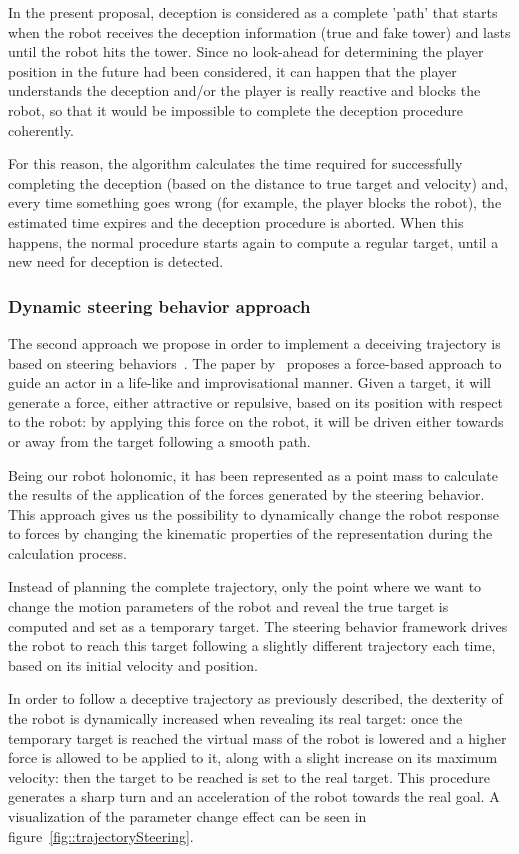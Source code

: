 In the present proposal, deception is considered as a complete 'path' that starts when the robot receives the deception information (true and fake tower) and lasts until the robot hits the tower. Since no look-ahead for determining the player position in the future had been considered, it can happen that the player understands the deception and/or the player is really reactive and blocks the robot, so that it would be impossible to complete the deception procedure coherently.

For this reason, the algorithm calculates the time required for successfully completing the deception (based on the distance to true target and velocity) and, every time something goes wrong (for example, the player blocks the robot), the estimated time expires and the deception procedure is aborted. When this happens, the normal procedure starts again to compute a regular target, until a new need for deception is detected.

\subsubsection{Dynamic steering behavior approach}
The second approach we propose in order to implement a deceiving trajectory is based on steering behaviors~\citep{reynolds_steering_1999}. The paper by~\cite{reynolds_steering_1999} proposes a force-based approach to guide an actor in a life-like and improvisational manner. Given a target, it will generate a force, either attractive or repulsive, based on its position with respect to the robot: by applying this force on the robot, it will be driven either towards or away from the target following a smooth path.

Being our robot holonomic, it has been represented as a point mass to calculate the results of the application of the forces generated by the steering behavior. This approach gives us the possibility to dynamically change the robot response to forces by changing the kinematic properties of the representation during the calculation process.

Instead of planning the complete trajectory, only the point where we want to change the motion parameters of the robot and reveal the true target is computed and set as a temporary target. The steering behavior framework drives the robot to reach this target following a slightly different trajectory each time, based on its initial velocity and position.

In order to follow a deceptive trajectory as previously described, the dexterity of the robot is dynamically increased when revealing its real target: once the temporary target is reached the virtual mass of the robot is lowered and a higher force is allowed to be applied to it, along with a slight increase on its maximum velocity: then the target to be reached is set to the real target. This procedure generates a sharp turn and an acceleration of the robot towards the real goal. A visualization of the parameter change effect can be seen in figure~\ref{fig::trajectorySteering}. 

